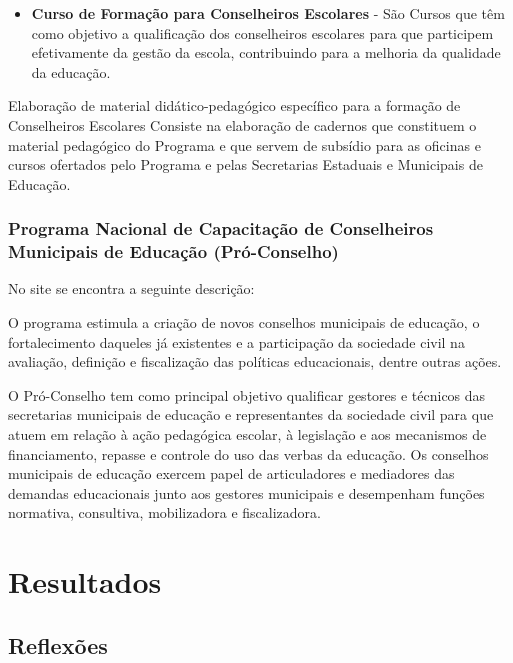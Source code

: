 \documentclass[
	12pt,				%
	openright,			%
	oneside,
	a4paper,			%
	chapter=TITLE,		%
	section=TITLE,		%
	sumario=abnt-6027-2012,
	english,			%
	brazil				%
]{abntex2}
\begin{document}
\begin{citacao}
\begin{itemize}[leftmargin=15.5mm]
				\item \textbf{Curso de Formação para Conselheiros Escolares} -	São Cursos que têm como objetivo a qualificação dos conselheiros escolares para que participem efetivamente da gestão da escola, contribuindo para a melhoria da qualidade da educação.

			\end{itemize}
			
			Elaboração de material didático-pedagógico específico para a formação de Conselheiros Escolares
			Consiste na elaboração de cadernos que constituem o material pedagógico do Programa e que servem de subsídio para as oficinas e cursos ofertados pelo Programa e pelas Secretarias Estaduais e Municipais de Educação.
		\end{citacao}
		
		\subsection{Programa   Nacional   de   Capacitação   de   Conselheiros   Municipais   de Educação (Pró-Conselho)}
		
	
		No site se encontra a seguinte descrição:
		
		\begin{citacao}
			O programa estimula a criação de novos conselhos municipais de educação, o fortalecimento daqueles já existentes e a participação da sociedade civil na avaliação, definição e fiscalização das políticas educacionais, dentre outras ações. 
			
			O Pró-Conselho tem como principal objetivo qualificar gestores e técnicos das secretarias municipais de educação e representantes da sociedade civil para que atuem em relação à ação pedagógica escolar, à legislação e aos mecanismos de financiamento, repasse e controle do uso das verbas da educação. Os conselhos municipais de educação exercem papel de articuladores e mediadores das demandas educacionais junto aos gestores municipais e desempenham funções normativa, consultiva, mobilizadora e fiscalizadora.
		\end{citacao}
		

\chapter{Resultados}

	\section{Reflexões}
\end{document}
